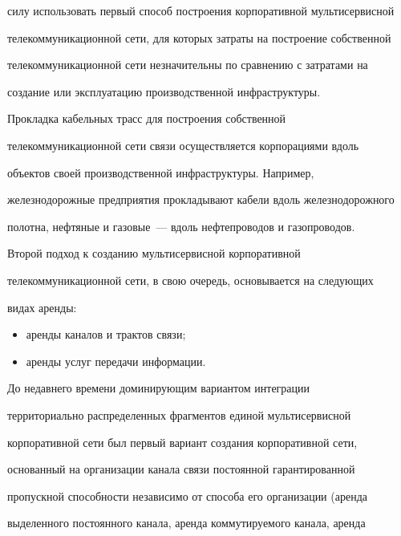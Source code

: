 силу использовать первый способ построения корпоративной мультисервисной 


телекоммуникационной сети, для которых затраты на построение собственной 


телекоммуникационной сети незначительны по сравнению с затратами на 


создание или эксплуатацию производственной инфраструктуры.


     


     Прокладка кабельных трасс для построения собственной 


телекоммуникационной сети связи осуществляется корпорациями вдоль 


объектов своей производственной инфраструктуры. Например, 


железнодорожные предприятия прокладывают кабели вдоль железнодорожного 


полотна, нефтяные и газовые~--- вдоль нефтепроводов и газопроводов. 


     


     Второй подход к созданию мультисервисной корпоративной 


телекоммуникационной сети, в свою очередь, основывается на следующих 


видах аренды: 


     \begin{itemize} %


\item аренды каналов и трактов связи;


\item аренды услуг передачи информации.


\end{itemize}


     


     До недавнего времени доминирующим вариантом интеграции 


территориально распределенных фрагментов единой мультисервисной 


корпоративной сети был первый вариант создания корпоративной сети, 


основанный на организации канала связи постоянной гарантированной 


пропускной способности независимо от способа его организации (аренда 


выделенного постоянного канала, аренда коммутируемого канала, аренда 


